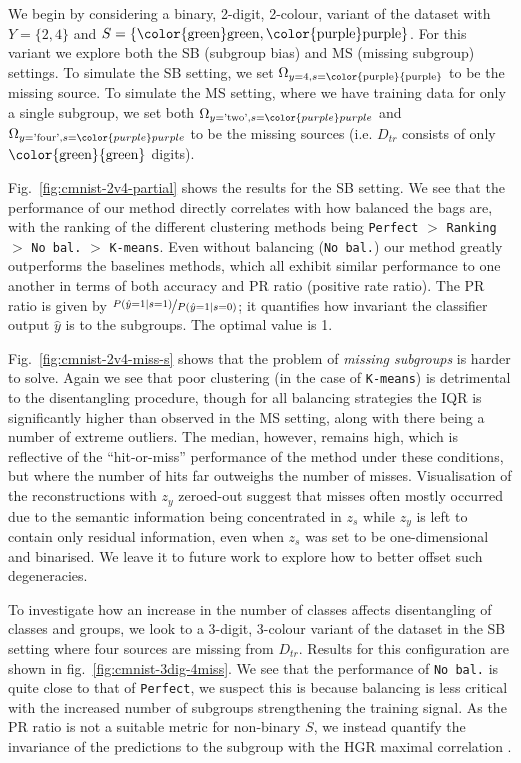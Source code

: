 We begin by considering a binary, 2-digit, 2-colour, variant of the dataset with $Y = \{2, 4\}$ and $S = \{\text{\color{green}green}, \text{\color{purple}purple}\}$.
For this variant we explore both the SB (subgroup bias) and MS (missing subgroup) settings.
To simulate the SB setting, we set  $\Omega_{y=4,s=\text{\color{purple}{purple}}}$ to be the missing source.
To simulate the MS setting, where we have training data for only a single subgroup, we set both $\Omega_{y=\text{'two'},s=\color{purple}purple}$ and $\Omega_{y=\text{'four'},s=\color{purple}purple}$ to be the missing sources (i.e. $D_{tr}$ consists of only $\text{\color{green}{green}}$ digits).
%

Fig.~\ref{fig:cmnist-2v4-partial} shows the results for the SB setting. We see that the performance of our method directly correlates with how balanced the bags are, with the ranking of the different clustering methods being \texttt{Perfect} $>$ \texttt{Ranking} $>$ \texttt{No bal.} $>$ \texttt{K-means}. Even without balancing (\texttt{No bal.}) our method greatly outperforms the baselines methods, which all exhibit similar performance to one another in terms of both accuracy and PR ratio (positive rate ratio).
The PR ratio is given by $\nicefrac{P(\hat{y}=1|s=1)}{P(\hat{y}=1|s=0)}$;
it quantifies how invariant the classifier output $\hat{y}$ is to the subgroups.
The optimal value is 1.

Fig.~\ref{fig:cmnist-2v4-miss-s} shows that the problem of \emph{missing subgroups} is harder to solve.
Again we see that poor clustering (in the case of \texttt{K-means}) is detrimental to the disentangling procedure, though for all balancing strategies the IQR is significantly higher than observed in the MS setting, along with there being a number of extreme outliers. The median, however, remains high, which is reflective of the ``hit-or-miss'' performance of the method under these conditions, but where the number of hits far outweighs the number of misses. Visualisation of the reconstructions with $z_y$ zeroed-out suggest that misses often mostly occurred due to the semantic information being concentrated in $z_s$ while $z_y$ is left to contain only residual information, even when $z_s$ was set to be one-dimensional and binarised. We leave it to future work to explore how to better offset such degeneracies.

To investigate how an increase in the number of classes affects disentangling of classes and groups, we look to a 3-digit, 3-colour variant of the dataset in the SB setting where four sources are missing from $D_{tr}$.
Results for this configuration are shown in fig.~\ref{fig:cmnist-3dig-4miss}.
We see that the performance of \texttt{No bal.} is quite close to that of \texttt{Perfect}, we suspect this is because balancing is less critical with the increased number of subgroups strengthening the training signal.
As the PR ratio is not a suitable metric for non-binary $S$,
we instead quantify the invariance of the predictions to the subgroup with
the HGR maximal correlation \citep{renyi1959measures}.
 
